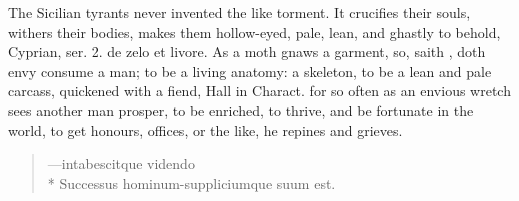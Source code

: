 {The Sicilian tyrants never invented the like torment. It crucifies
their souls, withers their bodies, makes them hollow-eyed, pale,
lean, and ghastly to behold, Cyprian, ser. 2. de zelo et livore.
As a moth gnaws a garment, so, saith \Chrysostom{}, doth envy
consume a man; to be a living anatomy: a skeleton, to be a lean and
pale carcass, quickened with a fiend, Hall in Charact. for
so often as an envious wretch sees another man prosper, to be enriched,
to thrive, and be fortunate in the world, to get honours, offices, or
the like, he repines and grieves.

\begin{verse}
---\textlatin{intabescitque videndo\\*
  Successus hominum-suppliciumque suum est}.
\end{verse}

}
